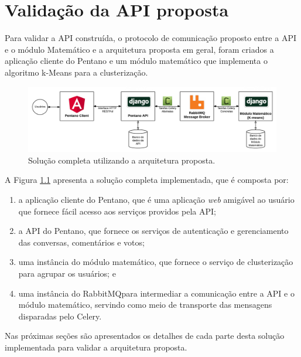\chapter{Validação da API proposta} \label{cap:aplicacao_exemplo}

  Para validar a API construída, o protocolo de comunicação proposto entre a API e o módulo Matemático
  e a arquitetura proposta em geral, foram criados a aplicação cliente do Pentano e um módulo matemático
  que implementa o algoritmo k-Means para a clusterização.
  
  \begin{figure}[h!]
    \centering
    \includegraphics[scale=0.3]{figuras/whole_solution.png}
    \caption{Solução completa utilizando a arquitetura proposta.}
    \label{fig:whole_solution}
  \end{figure}
  
  A Figura \ref{fig:whole_solution} apresenta a solução completa implementada, que
  é composta por:
  
  \begin{enumerate}
      \item a aplicação cliente do Pentano, que é uma aplicação \textit{web} amigável ao usuário que fornece 
      fácil acesso aos serviços providos pela API;
      \item a API do Pentano, que fornece os serviços de autenticação e gerenciamento das conversas, comentários e votos; 
      \item uma instância do módulo matemático,
	  que fornece o serviço de clusterização para agrupar os usuários; e
      \item uma instância do RabbitMQ\footnotemark para
	  intermediar a comunicação entre a API e o módulo matemático, servindo como meio de transporte das
	  mensagens disparadas pelo Celery.
  \end{enumerate}

  Nas próximas seções são apresentados os detalhes de cada parte desta solução implementada
  para validar a arquitetura proposta.
  
  
